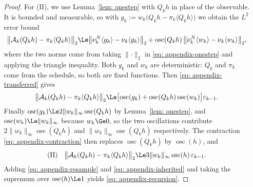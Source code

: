 \documentclass{article}
\begin{document}
\begin{proof}
For (II), we use Lemma~\ref{lem: onestep} with $Q_kh$ in place of the observable. It is bounded and measurable, so with $g_k := w_k\bigl(Q_kh-\pi_k\langle Q_kh\rangle\bigr)$ we obtain the $L^2$ error bound
\begin{equation*}
    \bigl\lVert \mathcal A_k(Q_kh)-\pi_k\langle Q_kh\rangle\bigr\rVert_2
    \Le \bigl\lVert\nu_k^N\langle g_k\rangle-\nu_k\langle g_k\rangle\bigr\rVert_2
    + \operatorname{osc}(Q_kh)\,\bigl\lVert\nu_k^N\langle w_k\rangle-\nu_k\langle w_k\rangle\bigr\rVert_2 ,
\end{equation*}
where the two norms come from taking $\lVert\cdot\rVert_2$ in \eqref{eq: appendix-onestep} and applying the triangle inequality. Both $g_k$ and $w_k$ are deterministic: $Q_k$ and $\pi_k$ come from the schedule, so both are fixed functions. Then \eqref{eq: appendix-transferred} gives
\begin{equation*}
    \bigl\lVert \mathcal A_k(Q_kh)-\pi_k\langle Q_kh\rangle\bigr\rVert_2
    \Le \bigl[\operatorname{osc}(g_k)+\operatorname{osc}(Q_kh)\operatorname{osc}(w_k)\bigr]\varepsilon_{k-1} .
\end{equation*}
Finally $\operatorname{osc}(g_k)\Le2\lVert w_k\rVert_\infty\operatorname{osc}(Q_kh)$ by Lemma~\ref{lem: onestep}, and $\operatorname{osc}(w_k)\Le\lVert w_k\rVert_\infty$ because $w_k\Ge0$, so the two oscillations contribute $2\lVert w_k\rVert_\infty\operatorname{osc}(Q_kh)$ and $\lVert w_k\rVert_\infty\operatorname{osc}(Q_kh)$ respectively. The contraction \eqref{eq: appendix-contraction} then replaces $\operatorname{osc}(Q_kh)$ by $\operatorname{osc}(h)$, and
\begin{equation}
	\text{(II)} \quad
    \bigl\lVert \mathcal A_k(Q_kh)-\pi_k\langle Q_kh\rangle\bigr\rVert_2
    \Le 3\lVert w_k\rVert_\infty\operatorname{osc}(h)\,\varepsilon_{k-1} .
    \label{eq: appendix-inherited}
\end{equation}
Adding \eqref{eq: appendix-resample} and \eqref{eq: appendix-inherited} and taking the supremum over $\operatorname{osc}(h)\Le1$ yields \eqref{eq: appendix-recursion}.


\end{proof}
\end{document}
